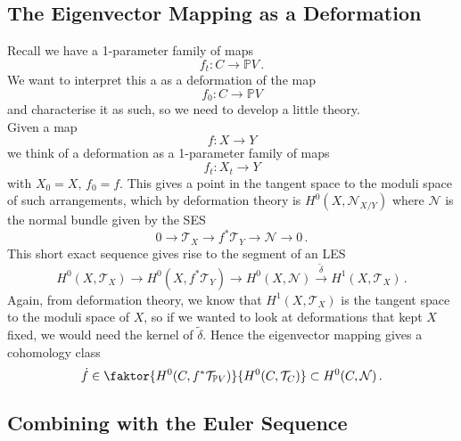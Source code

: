 \documentclass{article}
\begin{document}
\subsection{The Eigenvector Mapping as a Deformation}
Recall we have a 1-parameter family of maps 
\[
f_t : C \to \mathbb{P}V \, .
\]
We want to interpret this a as a deformation of the map 
\[
f_0 : C \to \mathbb{P}V
\]
and characterise it as such, so we need to develop a little theory. \\
Given a map 
\[
f : X \to Y
\]
we think of a deformation as a 1-parameter family of maps 
\[
f_t : X_t \to Y
\]
with $X_0=X, \, f_0 = f$. This gives a point in the tangent space to the moduli space of such arrangements, which by deformation theory is $H^0(X,\mathcal{N}_{X/Y})$ where $\mathcal{N}$ is the normal bundle given by the SES 
\[
0 \to \mathcal{T}_X \to f^\ast \mathcal{T}_Y \to \mathcal{N} \to 0 \, .
\]
This short exact sequence gives rise to the segment of an LES 
\[
H^0(X,\mathcal{T}_X) \to H^0(X,f^\ast \mathcal{T}_Y) \to H^0(X,\mathcal{N}) \overset{\tilde{\delta}}{\to} H^1(X,\mathcal{T}_X) \, .
\]
Again, from deformation theory, we know that $H^1(X,\mathcal{T}_X)$ is the tangent space to the moduli space of $X$, so if we wanted to look at deformations that kept $X$ fixed, we would need the kernel of $\tilde{\delta}$. Hence the eigenvector mapping gives a cohomology class
\[
\dot{f} \in \faktor{H^0(C,f^\ast \mathcal{T}_{\mathbb{P}V})}{H^0(C,\mathcal{T}_C)} \subset H^0(C,\mathcal{N}) \, . 
\]

\subsection{Combining with the Euler Sequence}
\end{document}
